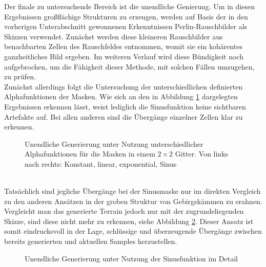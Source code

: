 Der finale zu untersuchende Bereich ist die unendliche Genierung. Um in diesen Ergebnissen großflächige Strukturen zu erzeugen, werden auf Basis der in den vorherigen Unterabschnitt gewonnenen Erkenntnissen Perlin-Rauschbilder als Skizzen verwendet. Zunächst werden diese kleineren Rauschbilder aus benachbarten Zellen des Rauschfeldes entnommen, womit sie ein kohärentes ganzheitliches Bild ergeben. Im weiteren Verlauf wird diese Bündigkeit noch aufgebrochen, um die Fähigkeit dieser Methode, mit solchen Fällen umzugehen, zu prüfen. \\
Zunächst allerdings folgt die Untersuchung der unterschiedlichen definierten Alphafunktionen der Masken. Wie sich an den in Abbildung \ref{fig:masks} dargelegten Ergebnissen erkennen lässt, weist lediglich die Sinusfunktion keine sichtbaren Artefakte auf. Bei allen anderen sind die Übergänge einzelner Zellen klar zu erkennen. 
\begin{figure}[htbp]
    \centering
    \caption{Unendliche Generierung unter Nutzung unterschiedlicher Alphafunktionen für die Masken in einem $2\times2$ Gitter. Von links nach rechts: Konstant, linear, exponential, Sinus}
    \label{fig:masks}
\end{figure} \\
Tatsächlich sind jegliche Übergänge bei der Sinusmaske nur im direkten Vergleich zu den anderen Ansätzen in der groben Struktur von Gebirgskämmen zu erahnen. Vergleicht man das generierte Terrain jedoch nur mit der zugrundeliegenden Skizze, sind diese nicht mehr zu erkennen, siehe Abbildung \ref{fig:cos_detail}. Dieser Ansatz ist somit eindrucksvoll in der Lage, schlüssige und überzeugende Übergänge zwischen bereits generierten und aktuellen Samples herzustellen.
\begin{figure}[htbp]
    \centering
    \caption{Unendliche Generierung unter Nutzung der Sinusfunktion im Detail}
    \label{fig:cos_detail}
\end{figure} \\
